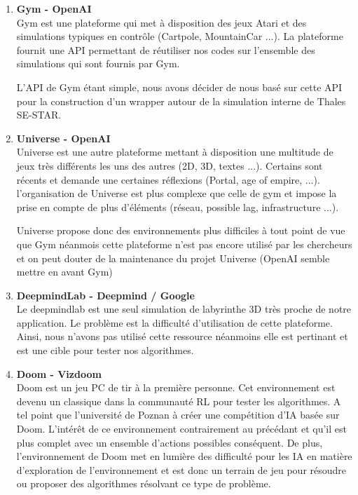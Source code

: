\begin{enumerate}
    \item \textbf{Gym\cite{1606.01540} - OpenAI}\\
    Gym est une plateforme qui met à disposition des jeux Atari et des simulations typiques en contrôle (Cartpole, MountainCar ...). La plateforme fournit une API permettant de réutiliser nos codes sur l'ensemble des simulations qui sont fournis par Gym.
    
    L'API de Gym étant simple, nous avons décider de nous basé sur cette API pour la construction d'un wrapper autour de la simulation interne de Thales SE-STAR.
    
    \item \textbf{Universe - OpenAI}\\
    Universe est une autre plateforme mettant à disposition une multitude de jeux très différents les uns des autres (2D, 3D, textes ...). Certains sont récents et demande une certaines réflexions (Portal, age of empire, ...). l'organisation de Universe est plus complexe que celle de gym et impose la prise en compte de plus d'éléments (réseau, possible lag, infrastructure ...). 
    
    Universe propose donc des environnements plus difficiles à tout point de vue que Gym néanmois cette plateforme n'est pas encore utilisé par les chercheurs et on peut douter de la maintenance du projet Universe (OpenAI semble mettre en avant Gym)
    
    \item \textbf{DeepmindLab\cite{DBLP:journals/corr/BeattieLTWWKLGV16} - Deepmind / Google }\\
    Le deepmindlab est une seul simulation de labyrinthe 3D très proche de notre application. Le problème est la difficulté d'utilisation de cette plateforme. Ainsi, nous n'avons pas utilisé cette ressource néanmoins elle est pertinant et est une cible pour tester nos algorithmes.
    
    \item \textbf{Doom - Vizdoom\cite{DBLP:journals/corr/KempkaWRTJ16}  }\\
    Doom est un jeu PC de tir à la première personne. Cet environnement est devenu un classique dans la communauté RL pour tester les algorithmes. A tel point que l'université de Poznan à créer une compétition d'IA basée sur Doom. L'intérêt de ce environnement contrairement au précédant et qu'il est plus complet avec un ensemble d'actions possibles conséquent. De plus, l'environnement de Doom met en lumière des difficulté pour les IA en matière d'exploration de l'environnement et est donc un terrain de jeu pour résoudre ou proposer des algorithmes résolvant ce type de problème.
    

\end{enumerate}

